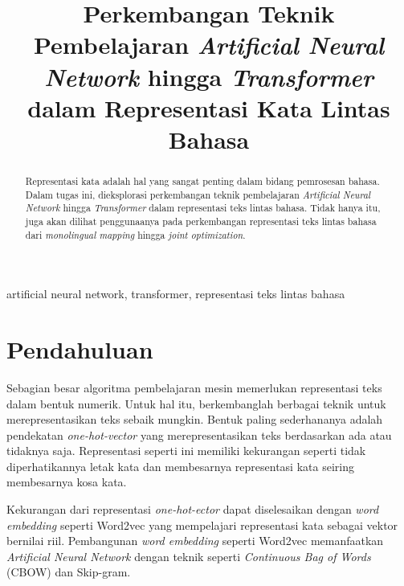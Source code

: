 \documentclass[conference]{IEEEtran}
\begin{document}
\title{Perkembangan Teknik Pembelajaran \textit{Artificial Neural Network} hingga \textit{Transformer} dalam Representasi Kata Lintas Bahasa\\}
\author{
}

\maketitle

\begin{abstract}
Representasi kata adalah hal yang sangat penting dalam bidang pemrosesan bahasa. Dalam tugas ini, dieksplorasi perkembangan teknik pembelajaran \textit{Artificial Neural Network} hingga \textit{Transformer} dalam representasi teks lintas bahasa. Tidak hanya itu, juga akan dilihat penggunaanya pada perkembangan representasi teks lintas bahasa dari \textit{monolingual mapping} hingga \textit{joint optimization}.
\end{abstract}

\begin{IEEEkeywords}
artificial neural network, transformer, representasi teks lintas bahasa
\end{IEEEkeywords}

\section{Pendahuluan}
Sebagian besar algoritma pembelajaran mesin memerlukan representasi teks dalam bentuk numerik. Untuk hal itu, berkembanglah berbagai teknik untuk merepresentasikan teks sebaik mungkin. Bentuk paling sederhananya adalah pendekatan \textit{one-hot-vector} yang merepresentasikan teks berdasarkan ada atau tidaknya saja. Representasi seperti ini memiliki kekurangan seperti tidak diperhatikannya letak kata dan membesarnya representasi kata seiring membesarnya kosa kata. 

Kekurangan dari representasi \textit{one-hot-ector} dapat diselesaikan dengan \textit{word embedding} seperti Word2vec \cite{b1} yang mempelajari representasi kata sebagai vektor bernilai riil. Pembangunan \textit{word embedding} seperti Word2vec memanfaatkan \textit{Artificial Neural Network} dengan teknik seperti \textit{Continuous Bag of Words} (CBOW) dan Skip-gram.
\end{document}
